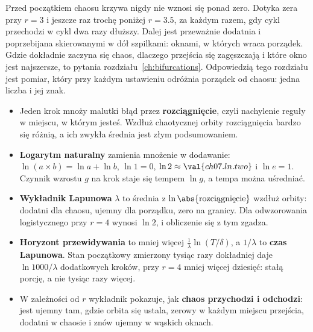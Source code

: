 
\noindent
Przed początkiem chaosu krzywa nigdy nie wznosi się ponad zero. Dotyka zera
przy $r = 3$ i jeszcze raz trochę poniżej $r = \num{3.5}$, za każdym razem,
gdy cykl przechodzi w cykl dwa razy dłuższy. Dalej jest przeważnie dodatnia
i poprzebijana skierowanymi w dół szpilkami: oknami, w których wraca
porządek. Gdzie dokładnie zaczyna się chaos, dlaczego przejścia się
zagęszczają i które okno jest najszersze, to pytania
rozdziału~\ref{ch:bifurcations}. Odpowiedzią tego rozdziału jest pomiar,
który przy każdym ustawieniu odróżnia porządek od chaosu: jedna liczba i jej
znak.

\begin{summarybox}
\begin{itemize}
\item Jeden krok mnoży malutki błąd przez \textbf{rozciągnięcie}, czyli
  nachylenie reguły w miejscu, w którym jesteś. Wzdłuż chaotycznej orbity
  rozciągnięcia bardzo się różnią, a ich zwykła średnia jest złym
  podsumowaniem.
\item \textbf{Logarytm naturalny} zamienia mnożenie w dodawanie:
  $\ln(a \times b) = \ln a + \ln b$, $\ln 1 = 0$, $\ln 2 \approx
  \val{ch07.ln.two}$ i $\ln e = 1$. Czynnik wzrostu $g$ na krok staje się
  tempem $\ln g$, a tempa można uśredniać.
\item \textbf{Wykładnik Lapunowa} $\lambda$ to średnia z
  $\ln\abs{\text{rozciągnięcie}}$ wzdłuż orbity: dodatni dla chaosu, ujemny
  dla porządku, zero na granicy. Dla odwzorowania logistycznego przy $r = 4$
  wynosi $\ln 2$, i obliczenie się z tym zgadza.
\item \textbf{Horyzont przewidywania} to mniej więcej
  $\frac{1}{\lambda}\ln(T/\delta)$, a $1/\lambda$ to \textbf{czas Lapunowa}.
  Stan początkowy zmierzony tysiąc razy dokładniej daje $\ln 1000/\lambda$
  dodatkowych kroków, przy $r = 4$ mniej więcej dziesięć: stałą porcję, a nie
  tysiąc razy więcej.
\item W zależności od $r$ wykładnik pokazuje, jak \textbf{chaos przychodzi i
  odchodzi}: jest ujemny tam, gdzie orbita się ustala, zerowy w każdym
  miejscu przejścia, dodatni w chaosie i znów ujemny w wąskich oknach.
\end{itemize}
\end{summarybox}

